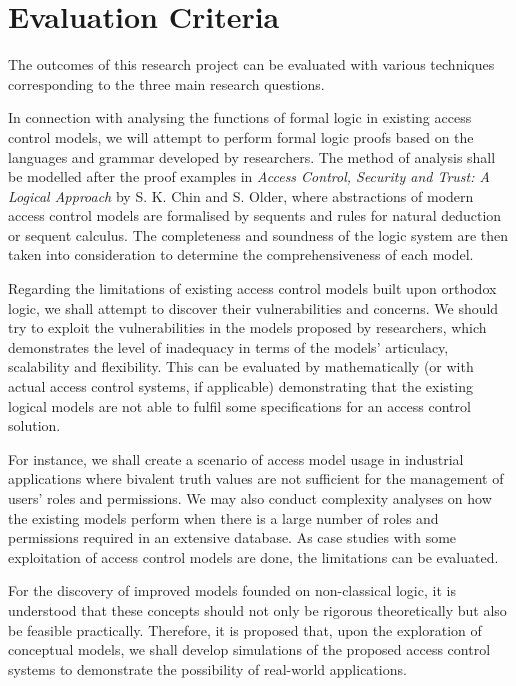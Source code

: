 \documentclass{article}
\begin{document}
\section*{Evaluation Criteria}

The outcomes of this research project can be evaluated with various techniques corresponding to the three main research questions.

In connection with analysing the functions of formal logic in existing access control models, we will attempt to perform formal logic proofs based on the languages and grammar developed by researchers. The method of analysis shall be modelled after the proof examples in \textit{Access Control, Security and Trust: A Logical Approach} by S. K. Chin and S. Older\cite{proofs}, where abstractions of modern access control models are formalised by sequents and rules for natural deduction or sequent calculus. The completeness and soundness of the logic system are then taken into consideration to determine the comprehensiveness of each model.

Regarding the limitations of existing access control models built upon orthodox logic, we shall attempt to discover their vulnerabilities and concerns. We should try to exploit the vulnerabilities in the models proposed by researchers, which demonstrates the level of inadequacy in terms of the models' articulacy, scalability\cite{distributed-systems} and flexibility. This can be evaluated by mathematically (or with actual access control systems, if applicable) demonstrating that the existing logical models are not able to fulfil some specifications for an access control solution.

For instance, we shall create a scenario of access model usage in industrial applications where bivalent truth values are not sufficient for the management of users' roles and permissions. We may also conduct complexity analyses on how the existing models perform when there is a large number of roles and permissions required in an extensive database. As case studies with some exploitation of access control models are done, the limitations can be evaluated.

For the discovery of improved models founded on non-classical logic, it is understood that these concepts should not only be rigorous theoretically but also be feasible practically. Therefore, it is proposed that, upon the exploration of conceptual models, we shall develop simulations of the proposed access control systems to demonstrate the possibility of real-world applications.
\end{document}
